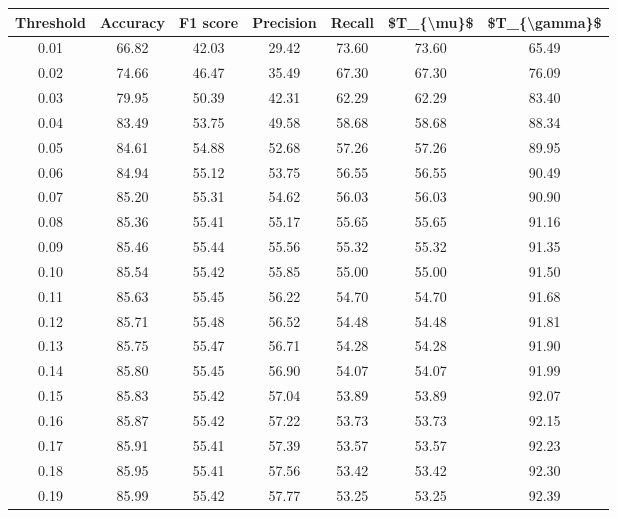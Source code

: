 \begin{tabular}{|c|c|c|c|c|c|c|}
\toprule
 Threshold &  Accuracy &  F1 score &  Precision &  Recall &  \$T\_\{\textbackslash mu\}\$ &  \$T\_\{\textbackslash gamma\}\$ \\
\hline
      0.01 &     66.82 &     42.03 &      29.42 &   73.60 &      73.60 &         65.49 \\
      0.02 &     74.66 &     46.47 &      35.49 &   67.30 &      67.30 &         76.09 \\
      0.03 &     79.95 &     50.39 &      42.31 &   62.29 &      62.29 &         83.40 \\
      0.04 &     83.49 &     53.75 &      49.58 &   58.68 &      58.68 &         88.34 \\
      0.05 &     84.61 &     54.88 &      52.68 &   57.26 &      57.26 &         89.95 \\
      0.06 &     84.94 &     55.12 &      53.75 &   56.55 &      56.55 &         90.49 \\
      0.07 &     85.20 &     55.31 &      54.62 &   56.03 &      56.03 &         90.90 \\
      0.08 &     85.36 &     55.41 &      55.17 &   55.65 &      55.65 &         91.16 \\
      0.09 &     85.46 &     55.44 &      55.56 &   55.32 &      55.32 &         91.35 \\
      0.10 &     85.54 &     55.42 &      55.85 &   55.00 &      55.00 &         91.50 \\
      0.11 &     85.63 &     55.45 &      56.22 &   54.70 &      54.70 &         91.68 \\
      0.12 &     85.71 &     55.48 &      56.52 &   54.48 &      54.48 &         91.81 \\
      0.13 &     85.75 &     55.47 &      56.71 &   54.28 &      54.28 &         91.90 \\
      0.14 &     85.80 &     55.45 &      56.90 &   54.07 &      54.07 &         91.99 \\
      0.15 &     85.83 &     55.42 &      57.04 &   53.89 &      53.89 &         92.07 \\
      0.16 &     85.87 &     55.42 &      57.22 &   53.73 &      53.73 &         92.15 \\
      0.17 &     85.91 &     55.41 &      57.39 &   53.57 &      53.57 &         92.23 \\
      0.18 &     85.95 &     55.41 &      57.56 &   53.42 &      53.42 &         92.30 \\
      0.19 &     85.99 &     55.42 &      57.77 &   53.25 &      53.25 &         92.39 \\

\end{tabular}
